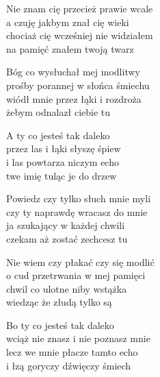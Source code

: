 \begin{text}
    Nie znam cię przecież prawie wcale\\
    a czuję jakbym znał cię wieki\\
    chociaż cię wcześniej nie widziałem\\
    na pamięć znałem twoją twarz

    Bóg co wysłuchał mej modlitwy\\
    prośby porannej w słońca śmiechu\\
    wiódł mnie przez łąki i rozdroża\\
    żebym odnalazł ciebie tu

    A ty co jesteś tak daleko\\
    przez las i łąki słyszę śpiew\\
    i las powtarza niczym echo\\
    twe imię tuląc je do drzew

    Powiedz czy tylko słuch mnie myli\\
    czy ty naprawdę wracasz do mnie\\
    ja szukający w każdej chwili\\
    czekam aż zostać zechcesz tu

    Nie wiem czy płakać czy się modlić\\
    o cud przetrwania w mej pamięci\\
    chwil co ulotne niby wstążka\\
    wiedząc że złudą tylko są

    Bo ty co jesteś tak daleko\\
    wciąż nie znasz i nie poznasz mnie\\
    lecz we mnie płacze tamto echo\\
    i łzą goryczy dźwięczy śmiech
\end{text}
\begin{chord}

\end{chord}
